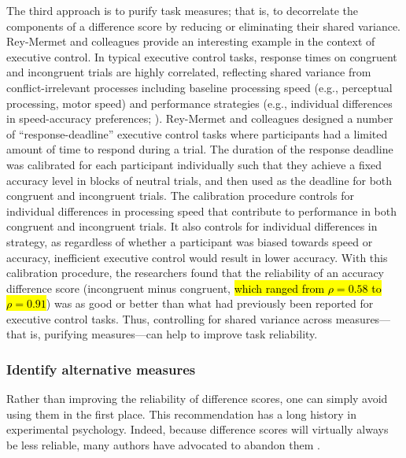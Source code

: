 \documentclass[a4paper,12pt]{article}
\begin{document}
The third approach is to purify task measures; that is, to decorrelate the components of a difference score by reducing or eliminating their shared variance. Rey-Mermet and colleagues \cite{rey2019executive} provide an interesting example in the context of executive control. In typical executive control tasks, response times on congruent and incongruent trials are highly correlated, reflecting shared variance from conflict-irrelevant processes including baseline processing speed (e.g., perceptual processing, motor speed) and performance strategies (e.g., individual differences in speed-accuracy preferences; \cite{draheim2019reaction}). Rey-Mermet and colleagues designed a number of ``response-deadline'' executive control tasks where participants had a limited amount of time to respond during a trial. The duration of the response deadline was calibrated for each participant individually such that they achieve a fixed accuracy level in blocks of neutral trials, and  then used as the deadline for both congruent and incongruent trials. The calibration procedure controls for individual differences in processing speed that contribute to performance in both congruent and incongruent trials. It also controls for individual differences in strategy, as regardless of whether a participant was biased towards speed or accuracy, inefficient executive control would result in lower accuracy. With this calibration procedure, the researchers found that the reliability of an accuracy difference score (incongruent minus congruent, \hl{which ranged from $\rho = 0.58$ to $\rho = 0.91$}) was as good or better than what had previously been reported for executive control tasks. Thus, controlling for shared variance across measures---that is, purifying measures---can help to improve task reliability.

\subsubsection{Identify alternative measures}

Rather than improving the reliability of difference scores, one can simply avoid using them in the first place. This recommendation has a long history in experimental psychology. Indeed, because difference scores will virtually always be less reliable, many authors have advocated to abandon them \cite{lord1956measurement, cronbach1970we, edwards2001ten}. 
\end{document}
